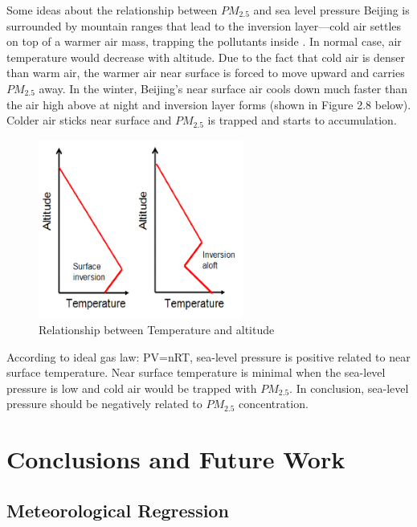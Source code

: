 \documentclass[11pt]{article} %
\begin{document}
Some ideas about the relationship between \(PM_{2.5}\) and sea level pressure
Beijing is surrounded by mountain ranges that lead to the inversion layer—cold air settles on top of a warmer air mass, trapping the pollutants inside \cite{Hawkins10}. In normal case, air temperature would decrease with altitude. Due to the fact that cold air is denser than warm air, the warmer air near surface is forced to move upward and carries \(PM_{2.5}\) away. In the winter, Beijing’s near surface air cools down much faster than the air high above at night and inversion layer forms (shown in Figure 2.8 below). Colder air sticks near surface and \(PM_{2.5}\) is trapped and starts to accumulation. 


 \begin{figure}[!ht]
  \centering
    \includegraphics[width=0.6\textwidth]{Figure2-8}
      \caption{Relationship between Temperature and altitude}
\end{figure}

According to ideal gas law: PV=nRT, sea-level pressure is positive related to near surface temperature.  Near surface temperature is minimal when the sea-level pressure is low and cold air would be trapped with \(PM_{2.5}\). In conclusion, sea-level pressure should be negatively related to \(PM_{2.5}\) concentration.





\section{Conclusions and Future Work}

\subsection{Meteorological Regression}
\end{document}
